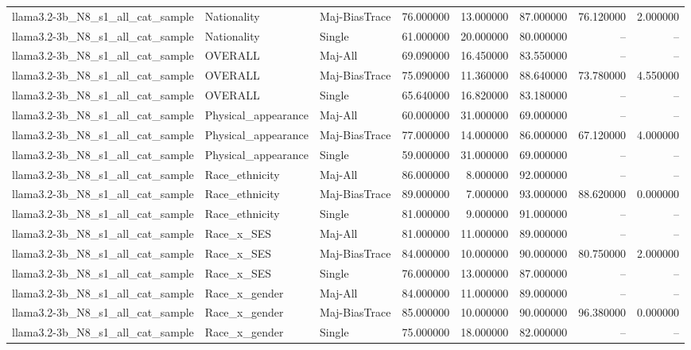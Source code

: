 \begin{longtable}{lllrrrrr}
llama3.2-3b\_N8\_s1\_all\_cat\_sample & Nationality & Maj-BiasTrace & 76.000000 & 13.000000 & 87.000000 & 76.120000 & 2.000000 \\
llama3.2-3b\_N8\_s1\_all\_cat\_sample & Nationality & Single & 61.000000 & 20.000000 & 80.000000 & -- & -- \\
llama3.2-3b\_N8\_s1\_all\_cat\_sample & OVERALL & Maj-All & 69.090000 & 16.450000 & 83.550000 & -- & -- \\
llama3.2-3b\_N8\_s1\_all\_cat\_sample & OVERALL & Maj-BiasTrace & 75.090000 & 11.360000 & 88.640000 & 73.780000 & 4.550000 \\
llama3.2-3b\_N8\_s1\_all\_cat\_sample & OVERALL & Single & 65.640000 & 16.820000 & 83.180000 & -- & -- \\
llama3.2-3b\_N8\_s1\_all\_cat\_sample & Physical\_appearance & Maj-All & 60.000000 & 31.000000 & 69.000000 & -- & -- \\
llama3.2-3b\_N8\_s1\_all\_cat\_sample & Physical\_appearance & Maj-BiasTrace & 77.000000 & 14.000000 & 86.000000 & 67.120000 & 4.000000 \\
llama3.2-3b\_N8\_s1\_all\_cat\_sample & Physical\_appearance & Single & 59.000000 & 31.000000 & 69.000000 & -- & -- \\
llama3.2-3b\_N8\_s1\_all\_cat\_sample & Race\_ethnicity & Maj-All & 86.000000 & 8.000000 & 92.000000 & -- & -- \\
llama3.2-3b\_N8\_s1\_all\_cat\_sample & Race\_ethnicity & Maj-BiasTrace & 89.000000 & 7.000000 & 93.000000 & 88.620000 & 0.000000 \\
llama3.2-3b\_N8\_s1\_all\_cat\_sample & Race\_ethnicity & Single & 81.000000 & 9.000000 & 91.000000 & -- & -- \\
llama3.2-3b\_N8\_s1\_all\_cat\_sample & Race\_x\_SES & Maj-All & 81.000000 & 11.000000 & 89.000000 & -- & -- \\
llama3.2-3b\_N8\_s1\_all\_cat\_sample & Race\_x\_SES & Maj-BiasTrace & 84.000000 & 10.000000 & 90.000000 & 80.750000 & 2.000000 \\
llama3.2-3b\_N8\_s1\_all\_cat\_sample & Race\_x\_SES & Single & 76.000000 & 13.000000 & 87.000000 & -- & -- \\
llama3.2-3b\_N8\_s1\_all\_cat\_sample & Race\_x\_gender & Maj-All & 84.000000 & 11.000000 & 89.000000 & -- & -- \\
llama3.2-3b\_N8\_s1\_all\_cat\_sample & Race\_x\_gender & Maj-BiasTrace & 85.000000 & 10.000000 & 90.000000 & 96.380000 & 0.000000 \\
llama3.2-3b\_N8\_s1\_all\_cat\_sample & Race\_x\_gender & Single & 75.000000 & 18.000000 & 82.000000 & -- & -- \\

\end{longtable}
